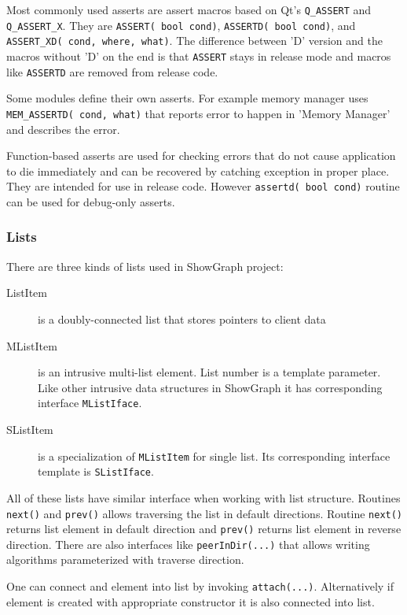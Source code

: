 \documentclass[11pt,a4paper]{article}
\begin{document}
Most commonly used asserts are assert macros based on Qt's \lstinline{Q_ASSERT} and \lstinline{Q_ASSERT_X}. They are \lstinline{ASSERT( bool cond)}, \lstinline{ASSERTD( bool cond)}, and \lstinline{ASSERT_XD( cond, where, what)}. The difference between 'D' version and the macros without 'D' on the end is that \lstinline{ASSERT} stays in release mode and macros like \lstinline{ASSERTD} are removed from release code. 

Some modules define their own asserts. For example memory manager uses  \lstinline{MEM_ASSERTD( cond, what)} that reports error to happen in 'Memory Manager' and describes the error.

Function-based asserts are used for checking errors that do not cause application to die immediately and can be recovered by catching exception in proper place. They are intended for use in release code. However \lstinline{assertd( bool cond)} routine can be used for debug-only asserts.

\subsubsection{Lists}
There are three kinds of lists used in ShowGraph project:
\begin{description}
\item[ListItem] is a doubly-connected list that stores pointers to client data
\item[MListItem] is an intrusive multi-list element. List number is a template parameter. Like other intrusive data structures in ShowGraph it has corresponding interface \lstinline{MListIface}.
\item[SListItem] is a specialization of \lstinline{MListItem} for single list. Its corresponding interface template is \lstinline{SListIface}.
\end{description}

All of these lists have similar interface when working with list structure. Routines \lstinline{next()} and \lstinline{prev()} allows traversing the list in default directions. Routine \lstinline{next()} returns list element in default direction and \lstinline{prev()} returns list element in reverse direction. There are also interfaces like \lstinline{peerInDir(...)} that allows writing algorithms parameterized with traverse direction. 

One can connect and element into list by invoking \lstinline{attach(...)}. Alternatively if element is created with appropriate constructor it is also connected into list.
\end{document}
